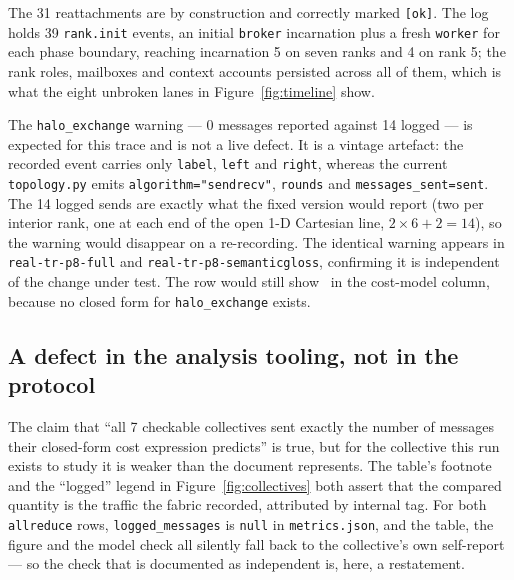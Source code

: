 \documentclass[11pt]{article}
\begin{document}
The 31 reattachments are by construction and correctly marked \texttt{[ok]}. The log holds 39
\texttt{rank.init} events, an initial \texttt{broker} incarnation plus a fresh \texttt{worker} for
each phase boundary, reaching incarnation 5 on seven ranks and 4 on rank 5; the rank roles,
mailboxes and context accounts persisted across all of them, which is what the eight unbroken
lanes in Figure~\ref{fig:timeline} show.

The \texttt{halo\_exchange} warning --- 0 messages reported against 14 logged --- is expected for
this trace and is not a live defect. It is a vintage artefact: the recorded event carries only
\texttt{label}, \texttt{left} and \texttt{right}, whereas the current \texttt{topology.py} emits
\texttt{algorithm="sendrecv"}, \texttt{rounds} and \texttt{messages\_sent=sent}. The 14 logged
sends are exactly what the fixed version would report (two per interior rank, one at each end of
the open 1-D Cartesian line, $2\times6+2=14$), so the warning would disappear on a re-recording.
The identical warning appears in \texttt{real-tr-p8-full} and \texttt{real-tr-p8-semanticgloss},
confirming it is independent of the change under test. The row would still show \modelna\ in the
cost-model column, because no closed form for \texttt{halo\_exchange} exists.

\subsection*{A defect in the analysis tooling, not in the protocol}

The claim that ``all 7 checkable collectives sent exactly the number of messages their closed-form
cost expression predicts'' is true, but for the collective this run exists to study it is weaker
than the document represents. The table's footnote and the ``logged'' legend in
Figure~\ref{fig:collectives} both assert that the compared quantity is the traffic the fabric
recorded, attributed by internal tag. For both \texttt{allreduce} rows,
\texttt{logged\_messages} is \texttt{null} in \texttt{metrics.json}, and the table, the figure and
the model check all silently fall back to the collective's own self-report --- so the check that is
documented as independent is, here, a restatement.
\end{document}
